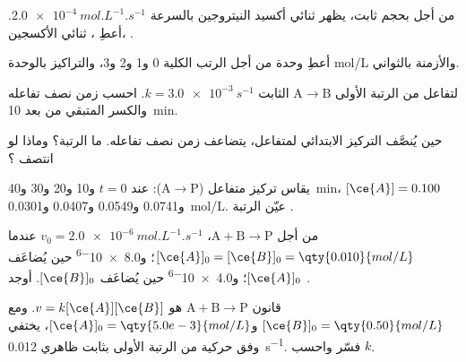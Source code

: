 \begin{exercise}[$\star$]\label{exo:b1:rate-laws:1}
من أجل  بحجم ثابت، يظهر ثنائي أكسيد النيتروجين بالسرعة
$\qty{2.0e-4}{mol.L^{-1}.s^{-1}}$. أعطِ ،  ثنائي الأكسجين،  .
\end{exercise}

\begin{exercise}[$\star$]\label{exo:b1:rate-laws:2}
أعطِ وحدة  من أجل الرتب الكلية 0 و1 و2 و3،
والتراكيز بالوحدة \unit{mol/L} والأزمنة بالثواني.
\end{exercise}

\begin{exercise}[$\star$]\label{exo:b1:rate-laws:3}
لتفاعل من الرتبة الأولى $\mathrm{A} \longrightarrow \mathrm{B}$ الثابت $k = \qty{3.0e-3}{s^{-1}}$. احسب
زمن نصف تفاعله والكسر المتبقي من  بعد \qty{10}{min}.
\end{exercise}

\begin{exercise}[$\star$]\label{exo:b1:rate-laws:4}
حين يُنصَّف التركيز الابتدائي لمتفاعل، يتضاعف زمن نصف تفاعله. ما
الرتبة؟ وماذا لو انتصف ؟
\end{exercise}

\begin{exercise}[$\star\star$]\label{exo:b1:rate-laws:5}
يقاس تركيز متفاعل  ($\mathrm{A} \longrightarrow \mathrm{P}$): عند $t
= 0$ و10 و20 و30 و\qty{40}{min}، $[\ce{A}] = 0.100$ و0.0741 و0.0549
و0.0407 و\qty{0.0301}{mol/L}. عيّن الرتبة .
\end{exercise}

\begin{exercise}[$\star\star$]\label{exo:b1:rate-laws:6}
من أجل $\mathrm{A} + \mathrm{B} \longrightarrow \mathrm{P}$، $v_0 = \qty{2.0e-6}{mol.L^{-1}.s^{-1}}$ عندما $[\ce{A}]_0
= [\ce{B}]_0 = \qty{0.010}{mol/L}$؛ و\qty{8.0e-6}{} حين يُضاعَف $[\ce{A}]_0$؛
و\qty{4.0e-6}{} حين يُضاعَف $[\ce{B}]_0$. أوجد   .
\end{exercise}

\begin{exercise}[$\star\star$]\label{exo:b1:rate-laws:7}
قانون  $\mathrm{A} + \mathrm{B} \longrightarrow \mathrm{P}$ هو $v = k[\ce{A}][\ce{B}]$. ومع
$[\ce{B}]_0 = \qty{0.50}{mol/L}$ و$[\ce{A}]_0 = \qty{5.0e-3}{mol/L}$،
يختفي  وفق حركية من الرتبة الأولى بثابت ظاهري
\qty{0.012}{s^{-1}}. فسّر واحسب $k$.
\end{exercise}

